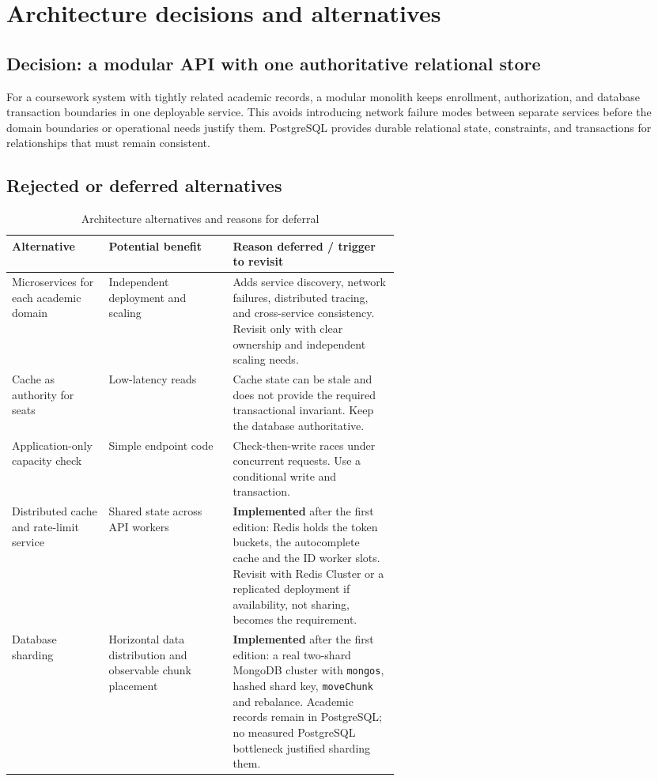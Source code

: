 \documentclass[11pt,a4paper,oneside]{report}
\begin{document}
\chapter{Architecture decisions and alternatives}
\section{Decision: a modular API with one authoritative relational store}
For a coursework system with tightly related academic records, a modular monolith keeps enrollment, authorization, and database transaction boundaries in one deployable service. This avoids introducing network failure modes between separate services before the domain boundaries or operational needs justify them. PostgreSQL provides durable relational state, constraints, and transactions for relationships that must remain consistent.

\section{Rejected or deferred alternatives}
\begin{table}[htbp]
\centering\small
\caption{Architecture alternatives and reasons for deferral}\label{tab:alternatives}
\begin{tabularx}{\linewidth}{@{}p{0.25\linewidth}p{0.32\linewidth}X@{}}\toprule
\textbf{Alternative} & \textbf{Potential benefit} & \textbf{Reason deferred / trigger to revisit} \\\midrule
Microservices for each academic domain & Independent deployment and scaling & Adds service discovery, network failures, distributed tracing, and cross-service consistency. Revisit only with clear ownership and independent scaling needs. \\
Cache as authority for seats & Low-latency reads & Cache state can be stale and does not provide the required transactional invariant. Keep the database authoritative. \\
Application-only capacity check & Simple endpoint code & Check-then-write races under concurrent requests. Use a conditional write and transaction. \\
Distributed cache and rate-limit service & Shared state across API workers & \textbf{Implemented} after the first edition: Redis holds the token buckets, the autocomplete cache and the ID worker slots. Revisit with Redis Cluster or a replicated deployment if availability, not sharing, becomes the requirement. \\
Database sharding & Horizontal data distribution and observable chunk placement & \textbf{Implemented} after the first edition: a real two-shard MongoDB cluster with \texttt{mongos}, hashed shard key, \texttt{moveChunk} and rebalance. Academic records remain in PostgreSQL; no measured PostgreSQL bottleneck justified sharding them. \\
\bottomrule
\end{tabularx}
\end{table}
\end{document}
